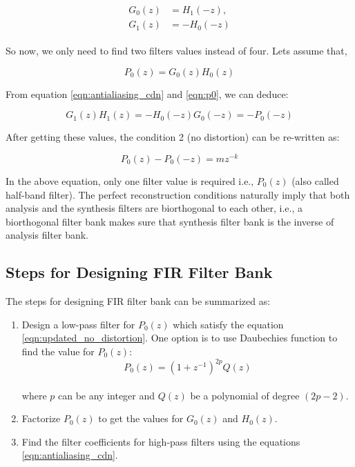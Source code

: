 \begin{align}
	\label{eqn:antialiasing_cdn}
	\begin{split}
		G_0(z) &=  H_1(-z), \\ 
		G_1(z) &=  -H_0(-z)
	\end{split}
\end{align}


So now, we only need to find two filters values instead of four. Lets assume that,

\begin{equation}\label{eqn:p0} 
{P_0(z)=G_{0}(z)H_{0}(z)}
\end{equation}

From equation \ref{eqn:antialiasing_cdn} and \ref{eqn:p0}, we can deduce:

\begin{equation} 
{G_{1}(z)H_{1}(z) = -H_{0}(-z)G_{0}(-z) = -P_0(-z)}
\end{equation}

After getting these values, the condition 2 (no distortion) can be re-written as:

\begin{equation}\label{eqn:updated_no_distortion} 
{P_0(z) - P_0(-z) =  mz^{-k}}
\end{equation}

In the above equation, only one filter value is required i.e., $P_0(z)$ (also called half-band filter). The perfect reconstruction conditions naturally imply that both analysis and the synthesis filters are biorthogonal to each other, i.e., a biorthogonal filter bank makes sure that synthesis filter bank is the inverse of analysis filter bank.


\subsection{Steps for Designing FIR Filter Bank}
The steps for designing FIR filter bank can be summarized as:

\begin{enumerate}
	\item Design a low-pass filter for $P_0(z)$ which satisfy the equation \ref{eqn:updated_no_distortion}. One option is to use Daubechies function to find the value for $P_0(z)$: \\ 
	\begin{equation}\label{eqn:updated_no_distortion} 
	{P_0(z) = (1 + z^{-1})^{2p}Q(z)}
	\end{equation} \\
	where $p$ can be any integer and $Q(z)$ be a polynomial of degree $(2p-2)$.
	\item Factorize $P_0(z)$ to get the values for $G_0(z)$ and $H_0(z)$.
	\item Find the filter coefficients for high-pass filters using the equations \ref{eqn:antialiasing_cdn}. 
\end{enumerate}


